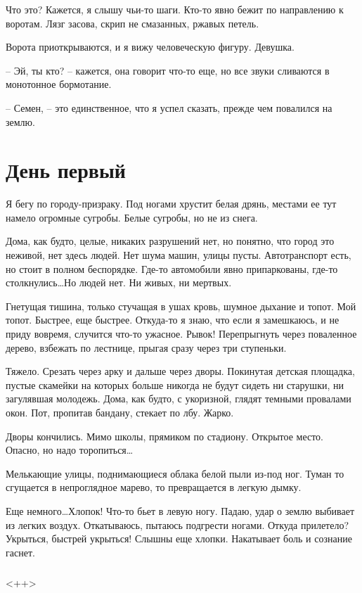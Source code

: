 \documentclass[a4paper]{book}
\begin{document}
Что это? Кажется, я слышу чьи-то шаги. Кто-то явно бежит по направлению к воротам. Лязг засова, скрип не смазанных, ржавых петель. 

Ворота приоткрываются, и я вижу человеческую фигуру. Девушка. 

-- Эй, ты кто? -- кажется, она говорит что-то еще, но все звуки сливаются в монотонное бормотание.

-- Семен, -- это единственное, что я успел сказать, прежде чем повалился на землю. 

\chapter{День первый}

Я бегу по городу-призраку. Под ногами хрустит белая дрянь, местами ее тут намело огромные сугробы. Белые сугробы, но не из снега. 

Дома, как будто, целые, никаких разрушений нет, но понятно, что город это неживой, нет здесь людей. Нет шума машин, улицы пусты. Автотранспорт есть, но стоит в полном беспорядке. Где-то автомобили явно припаркованы, где-то столкнулись\ldots Но людей нет. Ни живых, ни мертвых.

Гнетущая тишина, только стучащая в ушах кровь, шумное дыхание и топот. Мой топот. Быстрее, еще быстрее. Откуда-то я знаю, что если я замешкаюсь, и не приду вовремя, случится что-то ужасное.  Рывок! Перепрыгнуть через поваленное дерево, взбежать по лестнице, прыгая сразу через три ступеньки. 

Тяжело. Срезать через арку и дальше через дворы. Покинутая детская площадка, пустые скамейки на которых больше никогда не будут сидеть ни старушки, ни загулявшая молодежь. Дома, как будто, с укоризной, глядят темными провалами окон. Пот, пропитав бандану, стекает по лбу. Жарко. 

Дворы кончились. Мимо школы, прямиком по стадиону. Открытое место. Опасно, но надо торопиться\ldots 

Мелькающие улицы, поднимающиеся облака белой пыли из-под ног. Туман то сгущается в непроглядное марево, то превращается в легкую дымку. 

Еще немного\ldots Хлопок! Что-то бьет в левую ногу. Падаю, удар о землю выбивает из легких воздух. Откатываюсь, пытаюсь подгрести ногами. Откуда прилетело? Укрыться, быстрей укрыться! Слышны еще хлопки. Накатывает боль и сознание гаснет.
\\
\paragraph{}<++>
 
\end{document}
